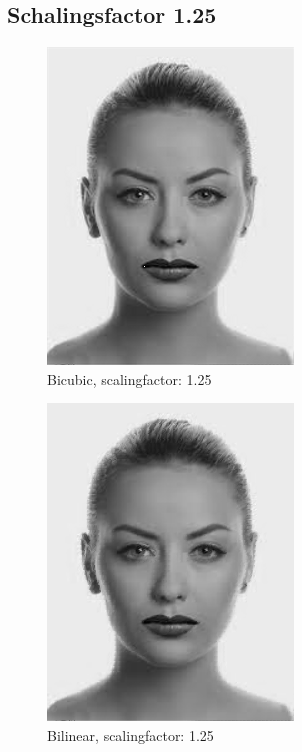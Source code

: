 \documentclass{article}
\begin{document}
\clearpage
\subsection{Schalingsfactor 1.25}

   \begin{figure}[H]
      \centering
      \includegraphics[]{assets/Bicubic_Female_125.png}
      \caption{Bicubic, scalingfactor: 1.25}
      \label{fig:sub1}
    \end{figure}%
    \begin{figure}[H]
      \centering
      \includegraphics[]{assets/Bilinear_Female_125.png}
      \caption{Bilinear, scalingfactor: 1.25}
      \label{fig:sub2}
    \end{figure}
\end{document}
